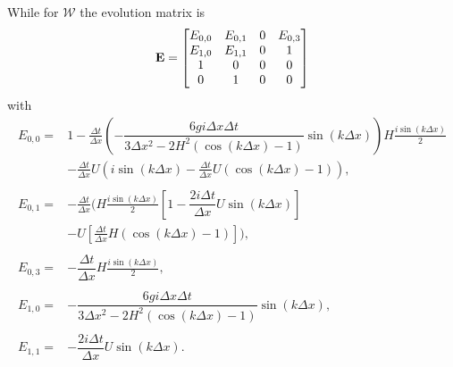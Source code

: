While for $\mathcal{W}$ the evolution matrix is 
\begin{equation}
\label{eqn:AppEvolW}
\mathbf{E} = \begin{bmatrix}
{E}_{0,0} & {E}_{0,1} & 0 & E_{0,3} \\
{E}_{1,0} & E_{1,1} &0 & 1 \\
1&0&0&0\\
0&1&0&0
\end{bmatrix}
\end{equation}
with
\begin{align*}
{E}_{0,0} = &1 - \frac{\Delta t}{\Delta x}\left(-\dfrac{6 gi \Delta x\Delta t}{3 \Delta x^2 -2{H^2} \left( \cos\left(k \Delta x\right) - 1 \right)}{ \sin\left(k \Delta x\right)}\right)H\frac{i\sin\left(k\Delta x\right)}{2} \\  & - \frac{\Delta t}{\Delta x}U\left(i\sin\left(k\Delta x\right) - \frac{\Delta t}{\Delta x}U\left(\cos\left(k\Delta x\right) - 1\right)\right), \\ \\
{E}_{0,1} = &- \frac{\Delta t}{\Delta x} \Bigg(H\frac{i\sin\left(k\Delta x\right)}{2}\left[ 1 -\dfrac{2i \Delta t }{\Delta x} U \sin\left(k \Delta x\right) \right] \\ & -U\left[\frac{\Delta t}{\Delta x}H\left(\cos\left(k\Delta x\right) - 1\right)\right] \Bigg),\\ \\
E_{0,3} = &- \dfrac{\Delta t}{\Delta x}H\frac{i\sin\left(k\Delta x\right)}{2},  \\ \\
 {E}_{1,0} = &-\dfrac{6 gi \Delta x\Delta t}{3 \Delta x^2 -2{H^2} \left( \cos\left(k \Delta x\right) - 1 \right)}{ \sin\left(k \Delta x\right)}, \\ \\
{E}_{1,1} = &-\dfrac{2i \Delta t }{\Delta x} U \sin\left(k \Delta x\right).
\end{align*}
